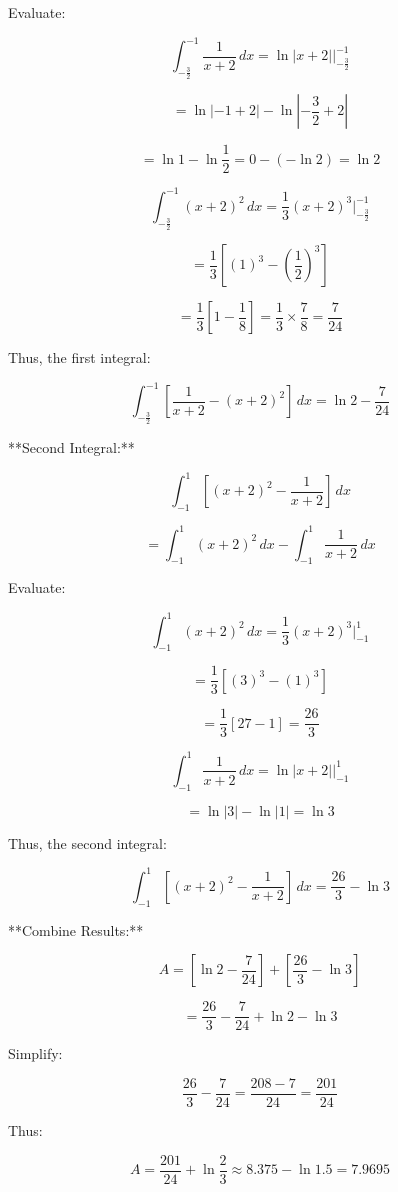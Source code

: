 \documentclass{article}
\begin{document}
Evaluate:

\[
\int_{-\frac{3}{2}}^{-1} \frac{1}{x + 2} \, dx = \ln |x + 2| \Bigg|_{-\frac{3}{2}}^{-1}
\]

\[
= \ln \left| -1 + 2 \right| - \ln \left| -\frac{3}{2} + 2 \right|
\]

\[
= \ln 1 - \ln \frac{1}{2} = 0 - (-\ln 2) = \ln 2
\]

\[
\int_{-\frac{3}{2}}^{-1} (x + 2)^2 \, dx = \frac{1}{3} (x + 2)^3 \Bigg|_{-\frac{3}{2}}^{-1}
\]

\[
= \frac{1}{3} \left[ (1)^3 - \left( \frac{1}{2} \right)^3 \right]
\]

\[
= \frac{1}{3} \left[ 1 - \frac{1}{8} \right] = \frac{1}{3} \times \frac{7}{8} = \frac{7}{24}
\]

Thus, the first integral:

\[
\int_{-\frac{3}{2}}^{-1} \left[ \frac{1}{x + 2} - (x + 2)^2 \right] \, dx = \ln 2 - \frac{7}{24}
\]

**Second Integral:**

\[
\int_{-1}^{1} \left[ (x + 2)^2 - \frac{1}{x + 2} \right] \, dx
\]

\[
= \int_{-1}^{1} (x + 2)^2 \, dx - \int_{-1}^{1} \frac{1}{x + 2} \, dx
\]

Evaluate:

\[
\int_{-1}^{1} (x + 2)^2 \, dx = \frac{1}{3} (x + 2)^3 \Bigg|_{-1}^{1}
\]

\[
= \frac{1}{3} \left[ (3)^3 - (1)^3 \right]
\]

\[
= \frac{1}{3} \left[ 27 - 1 \right] = \frac{26}{3}
\]

\[
\int_{-1}^{1} \frac{1}{x + 2} \, dx = \ln |x + 2| \Bigg|_{-1}^{1}
\]

\[
= \ln \left| 3 \right| - \ln \left| 1 \right| = \ln 3
\]

Thus, the second integral:

\[
\int_{-1}^{1} \left[ (x + 2)^2 - \frac{1}{x + 2} \right] \, dx = \frac{26}{3} - \ln 3
\]

**Combine Results:**

\[
A = \left[ \ln 2 - \frac{7}{24} \right] + \left[ \frac{26}{3} - \ln 3 \right]
\]

\[
= \frac{26}{3} - \frac{7}{24} + \ln 2 - \ln 3
\]

Simplify:

\[
\frac{26}{3} - \frac{7}{24} = \frac{208 - 7}{24} = \frac{201}{24}
\]

Thus:

\[
A = \frac{201}{24} + \ln \frac{2}{3} \approx 8.375 - \ln 1.5 = 7.9695
\]
\end{document}

